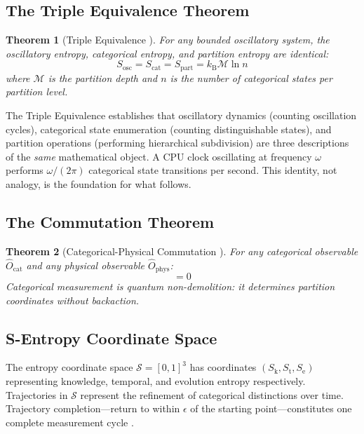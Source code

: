 \documentclass[11pt,a4paper]{article}
\newtheorem{theorem}{Theorem}[section]
\theoremstyle{definition}
\theoremstyle{remark}
\newcommand{\kB}{k_{\mathrm{B}}}
\newcommand{\Sk}{S_{\mathrm{k}}}
\newcommand{\St}{S_{\mathrm{t}}}
\newcommand{\Se}{S_{\mathrm{e}}}
\newcommand{\Sspace}{\mathcal{S}}
\newcommand{\Depth}{\mathcal{M}}
\begin{document}
\subsection{The Triple Equivalence Theorem}

\begin{theorem}[Triple Equivalence {\citep[Theorem~5.1]{sachikonye2025a}}]
\label{thm:triple_recap}
For any bounded oscillatory system, the oscillatory entropy, categorical entropy, and partition entropy are identical:
\begin{equation}
S_{\mathrm{osc}} = S_{\mathrm{cat}} = S_{\mathrm{part}} = \kB \Depth \ln n
\label{eq:triple_equivalence}
\end{equation}
where $\Depth$ is the partition depth and $n$ is the number of categorical states per partition level.
\end{theorem}

The Triple Equivalence establishes that oscillatory dynamics (counting oscillation cycles), categorical state enumeration (counting distinguishable states), and partition operations (performing hierarchical subdivision) are three descriptions of the \emph{same} mathematical object. A CPU clock oscillating at frequency $\omega$ performs $\omega/(2\pi)$ categorical state transitions per second. This identity, not analogy, is the foundation for what follows.

\subsection{The Commutation Theorem}

\begin{theorem}[Categorical-Physical Commutation {\citep[Theorem~8.1]{sachikonye2025a}}]
\label{thm:commutation_recap}
For any categorical observable $\hat{O}_{\mathrm{cat}}$ and any physical observable $\hat{O}_{\mathrm{phys}}$:
\begin{equation}
[\hat{O}_{\mathrm{cat}}, \hat{O}_{\mathrm{phys}}] = 0
\label{eq:commutation}
\end{equation}
Categorical measurement is quantum non-demolition: it determines partition coordinates without backaction.
\end{theorem}

\subsection{S-Entropy Coordinate Space}

The entropy coordinate space $\Sspace = [0,1]^3$ has coordinates $(\Sk, \St, \Se)$ representing knowledge, temporal, and evolution entropy respectively. Trajectories in $\Sspace$ represent the refinement of categorical distinctions over time. Trajectory completion---return to within $\epsilon$ of the starting point---constitutes one complete measurement cycle \citep{sachikonye2025a}.
\end{document}
